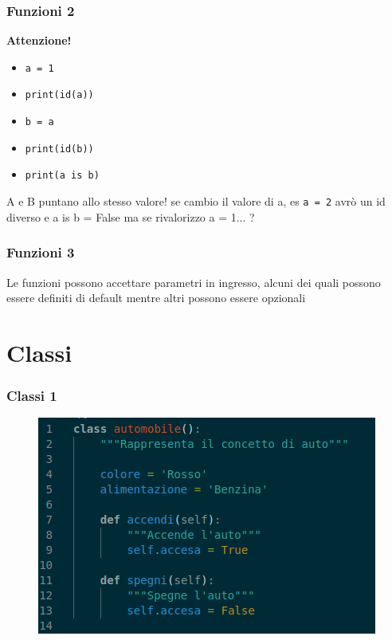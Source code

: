 \documentclass{beamer}
\begin{document}
\begin{frame}
    
    \frametitle{Funzioni 2}

    \textbf{Attenzione!}
    \begin{itemize}
        \item \texttt{a = 1}
        \item \texttt{print(id(a))}
        \item \texttt{b = a}
        \item \texttt{print(id(b))}
        \item \texttt{print(a is b)}
    \end{itemize}
    
    A e B puntano allo stesso valore!
    se cambio il valore di a, es \texttt{a = 2}
    avrò un id diverso e a is b = False
    ma se rivalorizzo a = 1... ?

\end{frame}

\begin{frame}
    
    \frametitle{Funzioni 3}

    Le funzioni possono accettare parametri in ingresso, alcuni dei quali possono essere definiti di default mentre altri possono essere opzionali

\end{frame}

\section{Classi}

\begin{frame}

    \frametitle{Classi 1}
    \begin{figure}
        \centering
        \includegraphics[width=1\linewidth]{image.png}
    \end{figure}

\end{frame}
\end{document}
